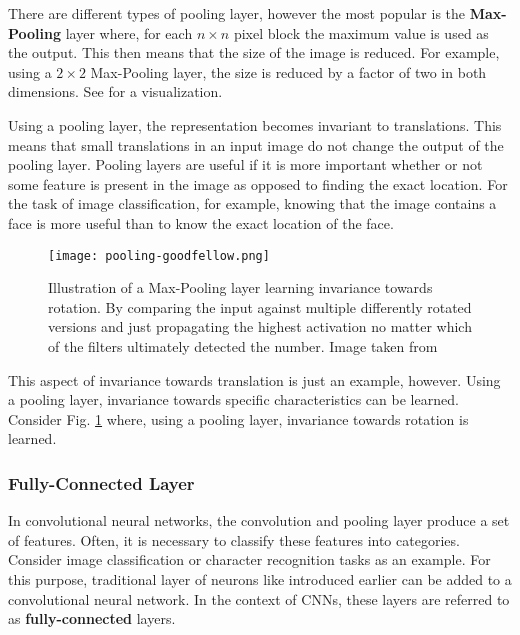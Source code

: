There are different types of pooling layer, however the most popular is the \textbf{Max-Pooling} layer where, for each $n \times n$ pixel block the maximum value is used as the output.
This then means that the size of the image is reduced.
For example, using a $2 \times 2$ Max-Pooling layer, the size is reduced by a factor of two in both dimensions.
See  for a visualization.

Using a pooling layer, the representation becomes invariant to translations.
This means that small translations in an input image do not change the output of the pooling layer.
Pooling layers are useful if it is more important whether or not some feature is present in the image as opposed to finding the exact location.
For the task of image classification, for example, knowing that the image contains a face is more useful than to know the exact location of the face.

\begin{figure}[htb!]
    \centering
    \texttt{[image: pooling-goodfellow.png]}
    \caption{Illustration of a Max-Pooling layer learning invariance towards rotation. By comparing the input against multiple differently rotated versions and just propagating the highest activation no matter which of the filters ultimately detected the number. Image taken from \cite{goodfellow_deep_2016}}
    \label{fig:pooling-goodfellow}
\end{figure}

This aspect of invariance towards translation is just an example, however.
Using a pooling layer, invariance towards specific characteristics can be learned.
Consider Fig. \ref{fig:pooling-goodfellow} where, using a pooling layer, invariance towards rotation is learned.

\subsubsection{Fully-Connected Layer}
In convolutional neural networks, the convolution and pooling layer produce a set of features.
Often, it is necessary to classify these features into categories.
Consider image classification or character recognition tasks as an example.
For this purpose, traditional layer of neurons like introduced earlier can be added to a convolutional neural network.
In the context of CNNs, these layers are referred to as \textbf{fully-connected} layers.
